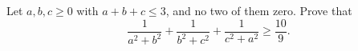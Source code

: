 Let $a,b,c\ge0$ with $a+b+c\le3$, and no two of them zero. Prove that
\[\dfrac1{a^2+b^2}+\dfrac1{b^2+c^2}+\dfrac1{c^2+a^2}\ge\dfrac{10}9.\]
